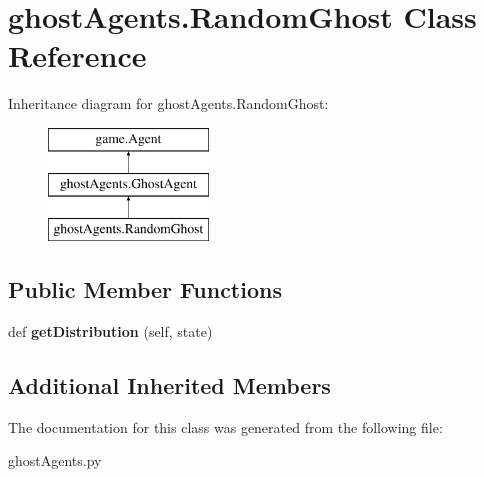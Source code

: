 \hypertarget{classghost_agents_1_1_random_ghost}{}\section{ghost\+Agents.\+Random\+Ghost Class Reference}
\label{classghost_agents_1_1_random_ghost}
Inheritance diagram for ghost\+Agents.\+Random\+Ghost\+:\begin{figure}[H]
\begin{center}
\leavevmode
\includegraphics[height=3.000000cm]{classghost_agents_1_1_random_ghost}
\end{center}
\end{figure}
\subsection*{Public Member Functions}
\begin{DoxyCompactItemize}
\item 
\mbox{\label{classghost_agents_1_1_random_ghost_a4ff85a0f0b0c82b2c80021470d6d6f25}} 
def {\bfseries get\+Distribution} (self, state)
\end{DoxyCompactItemize}
\subsection*{Additional Inherited Members}


The documentation for this class was generated from the following file\+:\begin{DoxyCompactItemize}
\item 
ghost\+Agents.\+py\end{DoxyCompactItemize}
